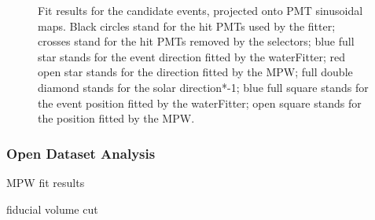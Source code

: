 \begin{figure}[htbp]
{\begin{minipage}[t]{0.4\textwidth}
		\end{minipage}
	}
	\caption{Fit results for the candidate events, projected onto PMT sinusoidal maps. Black circles stand for
	the hit PMTs used by the fitter; crosses stand for the hit PMTs removed by the selectors; blue full star stands for the event direction fitted by the waterFitter; red open star stands for the direction fitted by the MPW; full double diamond stands for the solar direction*-1; blue full square stands for the event position fitted by the waterFitter; open square stands for the position fitted by the MPW.}
	\label{openDataSetCandidate}
\end{figure}



\subsubsection{Open Dataset Analysis}

MPW fit results

fiducial volume cut






